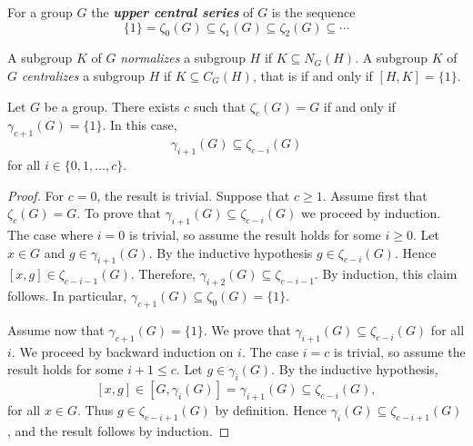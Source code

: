 For a group $G$ the \textbf{\em upper central series} of $G$ is the sequence 
\[
	\{1\}=\zeta_0(G)\subseteq\zeta_1(G)\subseteq\zeta_2(G)\subseteq\cdots
\]


A subgroup $K$ of $G$ {\em normalizes} a subgroup 
$H$ if $K\subseteq N_G(H)$.
A subgroup $K$ of $G$ {\em centralizes} a subgroup 
$H$ if $K\subseteq C_G(H)$, that is if and only if $[H,K]=\{1\}$.

\begin{lemma}
	\label{lem:gamma_zeta}
	Let $G$ be a group. There exists $c$ such that $\zeta_c(G)=G$ if and only if 
	$\gamma_{c+1}(G)=\{1\}$. In this case,  
	\[
	\gamma_{i+1}(G)\subseteq\zeta_{c-i}(G)
	\]
	for all $i\in\{0,1,\dots,c\}$. 
\end{lemma}

\begin{proof}
    For $c=0$, the result is trivial. Suppose that $c\geq 1$.
	Assume first that $\zeta_c(G)=G$. To prove that 
    $\gamma_{i+1}(G)\subseteq\zeta_{c-i}(G)$ we proceed by induction. The case where $i=0$ is
	trivial, so assume the result holds for some $i\geq0$. 
	Let $x\in G$ and $g\in \gamma_{i+1}(G)$. By the inductive hypothesis $g\in \zeta_{c-i}(G)$. 
	Hence $[x,g]\in \zeta_{c-i-1}(G)$. Therefore, $\gamma_{i+2}(G)\subseteq \zeta_{c-i-1}$.
	By induction, this claim follows. In particular, $\gamma_{c+1}(G)\subseteq \zeta_{0}(G)=\{ 1\}$.
	
	Assume now that $\gamma_{c+1}(G)=\{1\}$. We prove that 
	$\gamma_{i+1}(G)\subseteq\zeta_{c-i}(G)$ for all $i$. We proceed by backward induction on $i$. 
	The case $i=c$ is trivial, so assume the
	result holds for some $i+1\leq c$. Let $g\in\gamma_{i}(G)$. By the inductive hypothesis, 
	\[
	[x,g]\in [G,\gamma_i(G)]=\gamma_{i+1}(G)\subseteq\zeta_{c-i}(G),
	\]
	for all $x\in G$.
	Thus $g\in\zeta_{c-i+1}(G)$ by definition. Hence $\gamma_{i}(G)\subseteq\zeta_{c-i+1}(G)$, and the result follows
	by induction. 
\end{proof}

